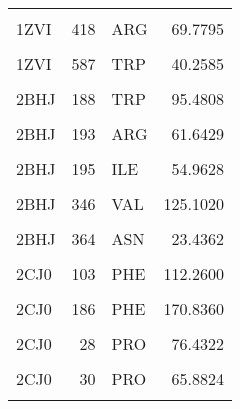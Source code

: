 \begin{table}
\begin{tabular}{lrlr}
			\cellcolor{gray!6}{1ZVI} & \cellcolor{gray!6}{416} & \cellcolor{gray!6}{VAL} & \cellcolor{gray!6}{55.0798}\\
			\addlinespace
			1ZVI & 418 & ARG & 69.7795\\
			\cellcolor{gray!6}{1ZVI} & \cellcolor{gray!6}{584} & \cellcolor{gray!6}{PHE} & \cellcolor{gray!6}{116.6380}\\
			1ZVI & 587 & TRP & 40.2585\\
			\cellcolor{gray!6}{1ZVI} & \cellcolor{gray!6}{592} & \cellcolor{gray!6}{GLU} & \cellcolor{gray!6}{140.0500}\\
			2BHJ & 188 & TRP & 95.4808\\
			\addlinespace
			\cellcolor{gray!6}{2BHJ} & \cellcolor{gray!6}{191} & \cellcolor{gray!6}{ALA} & \cellcolor{gray!6}{163.9660}\\
			2BHJ & 193 & ARG & 61.6429\\
			\cellcolor{gray!6}{2BHJ} & \cellcolor{gray!6}{194} & \cellcolor{gray!6}{CYS} & \cellcolor{gray!6}{118.0500}\\
			2BHJ & 195 & ILE & 54.9628\\
			\cellcolor{gray!6}{2BHJ} & \cellcolor{gray!6}{197} & \cellcolor{gray!6}{ARG} & \cellcolor{gray!6}{67.6390}\\
			\addlinespace
			2BHJ & 346 & VAL & 125.1020\\
			\cellcolor{gray!6}{2BHJ} & \cellcolor{gray!6}{363} & \cellcolor{gray!6}{PHE} & \cellcolor{gray!6}{116.4950}\\
			2BHJ & 364 & ASN & 23.4362\\
			\cellcolor{gray!6}{2BHJ} & \cellcolor{gray!6}{366} & \cellcolor{gray!6}{TRP} & \cellcolor{gray!6}{39.6654}\\
			2CJ0 & 103 & PHE & 112.2600\\
			\addlinespace
			\cellcolor{gray!6}{2CJ0} & \cellcolor{gray!6}{183} & \cellcolor{gray!6}{GLU} & \cellcolor{gray!6}{106.0810}\\
			2CJ0 & 186 & PHE & 170.8360\\
			\cellcolor{gray!6}{2CJ0} & \cellcolor{gray!6}{213} & \cellcolor{gray!6}{TRP} & \cellcolor{gray!6}{116.4780}\\
			2CJ0 & 28 & PRO & 76.4322\\
			\cellcolor{gray!6}{2CJ0} & \cellcolor{gray!6}{29} & \cellcolor{gray!6}{CYS} & \cellcolor{gray!6}{117.5660}\\
			\addlinespace
			2CJ0 & 30 & PRO & 65.8824\\
			\cellcolor{gray!6}{2CJ0} & \cellcolor{gray!6}{31} & \cellcolor{gray!6}{ALA} & \cellcolor{gray!6}{114.8710}\\

\end{tabular}
\end{table}

